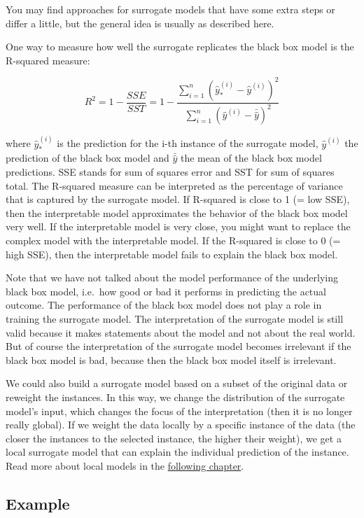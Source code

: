 \documentclass[
  10pt,
]{scrbook}
\begin{document}
You may find approaches for surrogate models that have some extra steps or differ a little, but the general idea is usually as described here.

One way to measure how well the surrogate replicates the black box model is the R-squared measure:

\[R^2=1-\frac{SSE}{SST}=1-\frac{\sum_{i=1}^n(\hat{y}_*^{(i)}-\hat{y}^{(i)})^2}{\sum_{i=1}^n(\hat{y}^{(i)}-\bar{\hat{y}})^2}\]

where \(\hat{y}_*^{(i)}\) is the prediction for the i-th instance of the surrogate model, \(\hat{y}^{(i)}\) the prediction of the black box model and \(\bar{\hat{y}}\) the mean of the black box model predictions.
SSE stands for sum of squares error and SST for sum of squares total.
The R-squared measure can be interpreted as the percentage of variance that is captured by the surrogate model.
If R-squared is close to 1 (= low SSE), then the interpretable model approximates the behavior of the black box model very well.
If the interpretable model is very close, you might want to replace the complex model with the interpretable model.
If the R-squared is close to 0 (= high SSE), then the interpretable model fails to explain the black box model.

Note that we have not talked about the model performance of the underlying black box model, i.e.~how good or bad it performs in predicting the actual outcome.
The performance of the black box model does not play a role in training the surrogate model.
The interpretation of the surrogate model is still valid because it makes statements about the model and not about the real world.
But of course the interpretation of the surrogate model becomes irrelevant if the black box model is bad, because then the black box model itself is irrelevant.

We could also build a surrogate model based on a subset of the original data or reweight the instances.
In this way, we change the distribution of the surrogate model's input, which changes the focus of the interpretation (then it is no longer really global).
If we weight the data locally by a specific instance of the data (the closer the instances to the selected instance, the higher their weight), we get a local surrogate model that can explain the individual prediction of the instance.
Read more about local models in the \protect\hyperlink{lime}{following chapter}.

\hypertarget{example-3}{%
\subsection{Example}\label{example-3}}
\end{document}
